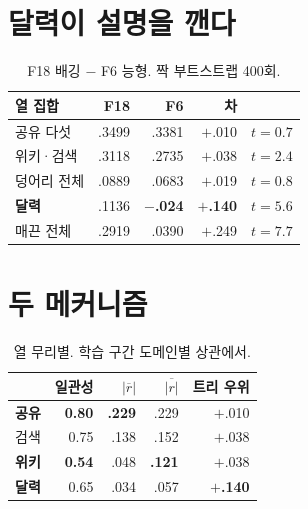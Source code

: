 \documentclass[10pt]{article}
\begin{document}

\section{달력이 설명을 깬다}

\begin{table}[t]
\centering\tsize
\caption{F18 배깅 $-$ F6 능형. 짝 부트스트랩 400회.}
\begin{tabular}{lrrrl}
\toprule
열 집합 & F18 & F6 & 차 & \\
\midrule
공유 다섯 & .3499 & .3381 & $+$.010 & $t{=}0.7$ \\
위키·검색 & .3118 & .2735 & $+$.038 & $t{=}2.4$ \\
덩어리 전체 & .0889 & .0683 & $+$.019 & $t{=}0.8$ \\
\textbf{달력} & .1136 & \textbf{$-$.024} & \textbf{$+$.140} & \textbf{$t{=}5.6$} \\
매끈 전체 & .2919 & .0390 & $+$.249 & $t{=}7.7$ \\
\bottomrule
\end{tabular}
\end{table}


\section{두 메커니즘}

\begin{table}[t]
\centering\tsize
\caption{열 무리별. 학습 구간 도메인별 상관에서.}
\begin{tabular}{lrrrr}
\toprule
& 일관성 & $|\overline{r}|$ & $\overline{|r|}$ & 트리 우위 \\
\midrule
\textbf{공유} & \textbf{0.80} & \textbf{.229} & .229 & $+$.010 \\
검색 & 0.75 & .138 & .152 & $+$.038 \\
\textbf{위키} & \textbf{0.54} & .048 & \textbf{.121} & $+$.038 \\
\textbf{달력} & 0.65 & .034 & .057 & \textbf{$+$.140} \\
\bottomrule
\end{tabular}
\end{table}
\end{document}
